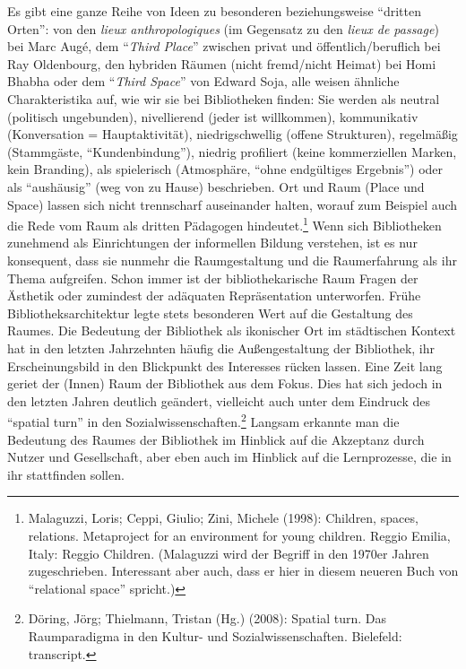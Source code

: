 Es gibt eine ganze Reihe von Ideen zu besonderen beziehungsweise
\enquote{dritten Orten}: von den \emph{lieux anthropologiques} (im
Gegensatz zu den \emph{lieux de passage}) bei Marc Augé, dem
\enquote{\emph{Third Place}} zwischen privat und öffentlich/beruflich
bei Ray Oldenbourg, den hybriden Räumen (nicht fremd/nicht Heimat) bei
Homi Bhabha oder dem \enquote{\emph{Third Space}} von Edward Soja, alle
weisen ähnliche Charakteristika auf, wie wir sie bei Bibliotheken
finden: Sie werden als neutral (politisch ungebunden), nivellierend
(jeder ist willkommen), kommunikativ (Konversation = Hauptaktivität),
niedrigschwellig (offene Strukturen), regelmäßig (Stammgäste,
\enquote{Kundenbindung}), niedrig profiliert (keine kommerziellen
Marken, kein Branding), als spielerisch (Atmosphäre, \enquote{ohne
endgültiges Ergebnis}) oder als \enquote{aushäusig} (weg von zu Hause)
beschrieben. Ort und Raum (Place und Space) lassen sich nicht
trennscharf auseinander halten, worauf zum Beispiel auch die Rede vom
Raum als dritten Pädagogen hindeutet.\footnote{Malaguzzi, Loris; Ceppi,
  Giulio; Zini, Michele (1998): Children, spaces, relations. Metaproject
  for an environment for young children. Reggio Emilia, Italy: Reggio
  Children. (Malaguzzi wird der Begriff in den 1970er Jahren
  zugeschrieben. Interessant aber auch, dass er hier in diesem neueren
  Buch von \enquote{relational space} spricht.)} Wenn sich Bibliotheken
zunehmend als Einrichtungen der informellen Bildung verstehen, ist es
nur konsequent, dass sie nunmehr die Raumgestaltung und die
Raumerfahrung als ihr Thema aufgreifen. Schon immer ist der
bibliothekarische Raum Fragen der Ästhetik oder zumindest der adäquaten
Repräsentation unterworfen. Frühe Bibliotheksarchitektur legte stets
besonderen Wert auf die Gestaltung des Raumes. Die Bedeutung der
Bibliothek als ikonischer Ort im städtischen Kontext hat in den letzten
Jahrzehnten häufig die Außengestaltung der Bibliothek, ihr
Erscheinungsbild in den Blickpunkt des Interesses rücken lassen. Eine
Zeit lang geriet der (Innen) Raum der Bibliothek aus dem Fokus. Dies hat
sich jedoch in den letzten Jahren deutlich geändert, vielleicht auch
unter dem Eindruck des \enquote{spatial turn} in den
Sozialwissenschaften.\footnote{Döring, Jörg; Thielmann, Tristan (Hg.)
  (2008): Spatial turn. Das Raumparadigma in den Kultur- und
  Sozialwissenschaften. Bielefeld: transcript.} Langsam erkannte man die
Bedeutung des Raumes der Bibliothek im Hinblick auf die Akzeptanz durch
Nutzer und Gesellschaft, aber eben auch im Hinblick auf die
Lernprozesse, die in ihr stattfinden sollen.

